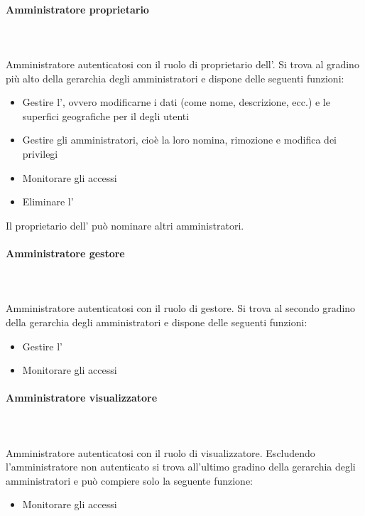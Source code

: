 \paragraph{Amministratore proprietario}\mbox{}\\ \\
Amministratore autenticatosi con il ruolo di proprietario dell'.
Si trova al gradino più alto della gerarchia degli amministratori e dispone delle seguenti funzioni:
\begin{itemize}
\item Gestire l', ovvero modificarne i dati (come nome, descrizione, ecc.) e le superfici geografiche per il  degli utenti
\item Gestire gli amministratori, cioè la loro nomina, rimozione e modifica dei privilegi
\item Monitorare gli accessi
\item Eliminare l'
\end{itemize}
Il proprietario dell' può nominare altri amministratori.
\paragraph{Amministratore gestore}\mbox{}\\ \\
Amministratore autenticatosi con il ruolo di gestore. 
Si trova al secondo gradino della gerarchia degli amministratori e dispone delle seguenti funzioni:
\begin{itemize}
\item Gestire l'
\item Monitorare gli accessi
\end{itemize}
\paragraph{Amministratore visualizzatore}\mbox{}\\ \\
Amministratore autenticatosi con il ruolo di visualizzatore.
Escludendo l'amministratore non autenticato si trova all'ultimo gradino della gerarchia degli amministratori e può compiere solo la seguente funzione:
\begin{itemize}
\item Monitorare gli accessi
\end{itemize}




